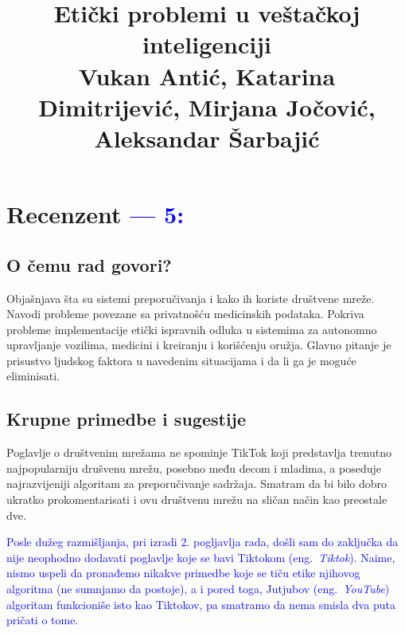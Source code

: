 \documentclass[a4paper]{report}
\newcommand{\odgovor}[1]{\textcolor{blue}{#1}}
\begin{document}
\title{Etički problemi u veštačkoj inteligenciji\\ \small{Vukan Antić, Katarina Dimitrijević, Mirjana Jočović, Aleksandar Šarbajić}}

\maketitle

\tableofcontents


\chapter{Recenzent \odgovor{--- 5:} }


\section{O čemu rad govori?}
Objašnjava šta su sistemi preporučivanja i kako ih koriste društvene mreže. Navodi probleme povezane sa privatnošću medicinskih  podataka. Pokriva probleme implementacije etički ispravnih odluka u sistemima za autonomno upravljanje vozilima, medicini i kreiranju i korišćenju oružja. Glavno pitanje je prisustvo ljudskog faktora u navedenim situacijama i da li ga je moguće eliminisati.

\section{Krupne primedbe i sugestije}
Poglavlje o društvenim mrežama ne spominje TikTok koji predstavlja trenutno najpopularniju drušvenu mrežu, posebno među decom i mladima, a poseduje najrazvijeniji algoritam za preporučivanje sadržaja. Smatram da bi bilo dobro ukratko prokomentarisati i ovu društvenu mrežu na sličan način kao preostale dve. 

\odgovor{Posle dužeg razmišljanja, pri izradi 2. pogljavlja rada, došli sam do zaključka da nije neophodno dodavati poglavlje koje se bavi Tiktokom (eng.~{\em Tiktok}). Naime, nismo uspeli da pronađemo nikakve primedbe koje se tiču etike njihovog algoritma (ne sumnjamo da postoje), a i pored toga, Jutjubov (eng.~{\em YouTube}) algoritam funkcioniše isto kao Tiktokov, pa smatramo da nema smisla dva puta pričati o tome.}
\end{document}
